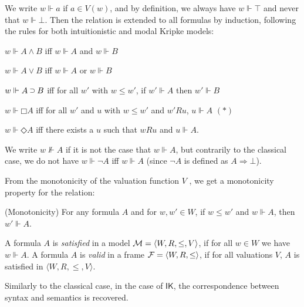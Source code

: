 \documentclass[twoside]{aiml18}
\newcommand*{\IK}{\mathsf{IK}}
\newcommand*{\AND}{\mathbin{\wedge}}
\newcommand*{\OR}{\mathbin{\vee}}
\newcommand*{\IMP}{\mathbin{\scalebox{.9}{\raise.2ex\hbox{$\supset$}}}}
\newcommand*{\BOX}{\mathord{\Box}}
\newcommand*{\DIA}{\mathord{\Diamond}}
\newcommand{\SEQ}{\Rightarrow}
\begin{document}
We write $w \Vdash a$ if $a \in V(w)$, and by definition, we always have $w \Vdash \top$ and never that $w \Vdash \bot$. 
%
Then the relation is extended to all formulas by induction, following the rules for both intuitionistic and modal Kripke models:

$w \Vdash A \AND B$ iff $w \Vdash A$ and $w \Vdash B$

$w \Vdash A \OR B$ iff $w \Vdash A$ or $w \Vdash B$

$w \Vdash A \IMP B$ iff for all $w'$ with $w \le w'$, if $w' \Vdash A$ then $w' \Vdash B$

$w \Vdash \BOX A$ iff for all $w'$ and $u$ with $w \le w'$ and $w'Ru$, $u \Vdash A$ \hfill $(\ast)$

$w \Vdash \DIA A$ iff there exists a $u$ such that $wRu$ and $u \Vdash A$.


We write $w \not\Vdash A$ if it is not the case that $w \Vdash A$, but contrarily to the classical case, we do not have $w \Vdash \neg A$ iff $w \Vdash A$ (since $\neg A$ is defined as $A \SEQ \bot$).

From the monotonicity of the valuation function $V$ , we get a monotonicity property for the relation:
\begin{proposition}(Monotonicity) 
For any formula $A$ and for $w, w' \in W$, if $w \le w'$ and $w \Vdash A$, then $w' \Vdash A$.
\end{proposition}



\begin{definition}
	A formula $A$ is \emph{satisfied} in a model $\mathcal{M} = \langle W, R, \le, V \rangle$, if for all $w \in W$ we have $w \Vdash A$.
%
	A formula $A$ is \emph{valid} in a frame $\mathcal{F} = \langle W, R, \le \rangle$, if for all valuations $V$, $A$ is satisfied in $\langle W, R, \le, V \rangle$.
\end{definition}



%

Similarly to the classical case, in the case of $\IK$, the correspondence between syntax and semantics is recovered.
\end{document}
